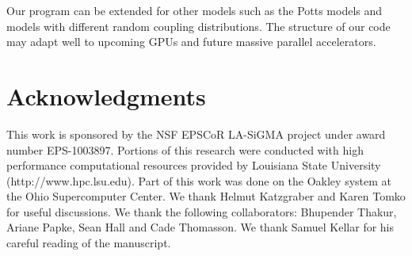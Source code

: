Our program can be extended for other models such as the Potts models and models with different random coupling distributions.
The structure of our code may adapt well to upcoming GPUs and future massive parallel accelerators.


\section*{Acknowledgments}

This work is sponsored by the NSF EPSCoR LA-SiGMA project under award number EPS-1003897. 
Portions of this research were conducted with high performance computational resources provided by 
Louisiana State University (http://www.hpc.lsu.edu).  Part of this work was done on the Oakley 
system at the Ohio Supercomputer Center. We thank Helmut Katzgraber and Karen Tomko for useful discussions. 
We thank the following collaborators: Bhupender Thakur, 
Ariane Papke, Sean Hall and Cade Thomasson. We thank Samuel Kellar for his careful reading of the manuscript.

